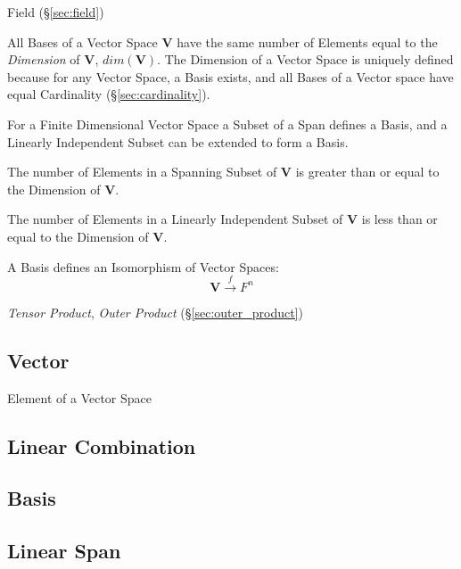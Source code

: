 Field (\S\ref{sec:field})

All Bases of a Vector Space $\mathbf{V}$ have the same number of
Elements equal to the \emph{Dimension} of $\mathbf{V}$,
$dim(\mathbf{V})$. The Dimension of a Vector Space is uniquely defined
because for any Vector Space, a Basis exists, and all Bases of a
Vector space have equal Cardinality (\S\ref{sec:cardinality}).

For a Finite Dimensional Vector Space a Subset of a Span defines a
Basis, and a Linearly Independent Subset can be extended to form a
Basis.

The number of Elements in a Spanning Subset of $\mathbf{V}$ is greater
than or equal to the Dimension of $\mathbf{V}$.

The number of Elements in a Linearly Independent Subset of
$\mathbf{V}$ is less than or equal to the Dimension of $\mathbf{V}$.

A Basis defines an Isomorphism of Vector Spaces:
\[
    \mathbf{V} \xrightarrow{f} F^n
\]

\emph{Tensor Product}, \emph{Outer Product} (\S\ref{sec:outer_product})



\subsection{Vector}\label{sec:vector}

Element of a Vector Space



\subsection{Linear Combination}\label{sec:linear_combination}

\subsection{Basis}\label{sec:basis}

\subsection{Linear Span}\label{sec:linear_span}

